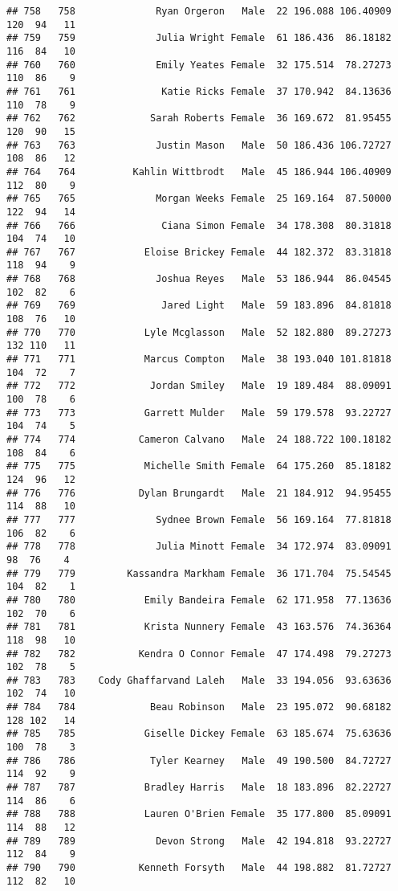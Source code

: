\documentclass[
]{article}
\begin{document}
\begin{verbatim}
## 758   758              Ryan Orgeron   Male  22 196.088 106.40909 120  94   11
## 759   759              Julia Wright Female  61 186.436  86.18182 116  84   10
## 760   760              Emily Yeates Female  32 175.514  78.27273 110  86    9
## 761   761               Katie Ricks Female  37 170.942  84.13636 110  78    9
## 762   762             Sarah Roberts Female  36 169.672  81.95455 120  90   15
## 763   763              Justin Mason   Male  50 186.436 106.72727 108  86   12
## 764   764          Kahlin Wittbrodt   Male  45 186.944 106.40909 112  80    9
## 765   765              Morgan Weeks Female  25 169.164  87.50000 122  94   14
## 766   766               Ciana Simon Female  34 178.308  80.31818 104  74   10
## 767   767            Eloise Brickey Female  44 182.372  83.31818 118  94    9
## 768   768              Joshua Reyes   Male  53 186.944  86.04545 102  82    6
## 769   769               Jared Light   Male  59 183.896  84.81818 108  76   10
## 770   770            Lyle Mcglasson   Male  52 182.880  89.27273 132 110   11
## 771   771            Marcus Compton   Male  38 193.040 101.81818 104  72    7
## 772   772             Jordan Smiley   Male  19 189.484  88.09091 100  78    6
## 773   773            Garrett Mulder   Male  59 179.578  93.22727 104  74    5
## 774   774           Cameron Calvano   Male  24 188.722 100.18182 108  84    6
## 775   775            Michelle Smith Female  64 175.260  85.18182 124  96   12
## 776   776           Dylan Brungardt   Male  21 184.912  94.95455 114  88   10
## 777   777              Sydnee Brown Female  56 169.164  77.81818 106  82    6
## 778   778              Julia Minott Female  34 172.974  83.09091  98  76    4
## 779   779         Kassandra Markham Female  36 171.704  75.54545 104  82    1
## 780   780            Emily Bandeira Female  62 171.958  77.13636 102  70    6
## 781   781            Krista Nunnery Female  43 163.576  74.36364 118  98   10
## 782   782           Kendra O Connor Female  47 174.498  79.27273 102  78    5
## 783   783    Cody Ghaffarvand Laleh   Male  33 194.056  93.63636 102  74   10
## 784   784             Beau Robinson   Male  23 195.072  90.68182 128 102   14
## 785   785            Giselle Dickey Female  63 185.674  75.63636 100  78    3
## 786   786             Tyler Kearney   Male  49 190.500  84.72727 114  92    9
## 787   787            Bradley Harris   Male  18 183.896  82.22727 114  86    6
## 788   788            Lauren O'Brien Female  35 177.800  85.09091 114  88   12
## 789   789              Devon Strong   Male  42 194.818  93.22727 112  84    9
## 790   790           Kenneth Forsyth   Male  44 198.882  81.72727 112  82   10

\end{verbatim}
\end{document}
